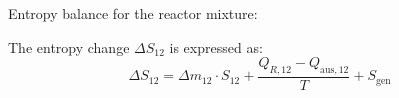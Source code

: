 Entropy balance for the reactor mixture:  

The entropy change \( \Delta S_{12} \) is expressed as:  
\[
\Delta S_{12} = \Delta m_{12} \cdot S_{12} + \frac{Q_{R,12} - Q_{\text{aus},12}}{T} + S_{\text{gen}}
\]